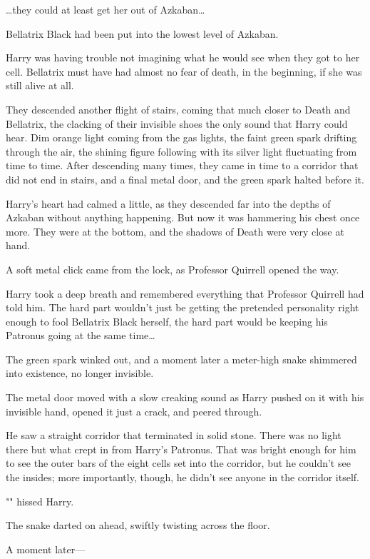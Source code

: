 {\ldots}they could at least get her out of Azkaban{\ldots}

Bellatrix Black had been put into the lowest level of Azkaban.

Harry was having trouble not imagining what he would see when they got to her 
cell. Bellatrix must have had almost no fear of death, in the beginning, if she 
was still alive at all.

They descended another flight of stairs, coming that much closer to Death and 
Bellatrix, the clacking of their invisible shoes the only sound that Harry 
could hear. Dim orange light coming from the gas lights, the faint green spark 
drifting through the air, the shining figure following with its silver light 
fluctuating from time to time.
\sbreak
After descending many times, they came in time to a corridor that did not end 
in stairs, and a final metal door, and the green spark halted before it.

Harry's heart had calmed a little, as they descended far into the depths of 
Azkaban without anything happening. But now it was hammering his chest once 
more. They were at the bottom, and the shadows of Death were very close at hand.

A soft metal click came from the lock, as Professor Quirrell opened the way.

Harry took a deep breath and remembered everything that Professor Quirrell had 
told him. The hard part wouldn't just be getting the pretended personality 
right enough to fool Bellatrix Black herself, the hard part would be keeping 
his Patronus going at the same time{\ldots}

The green spark winked out, and a moment later a meter-high snake shimmered 
into existence, no longer invisible.

The metal door moved with a slow creaking sound as Harry pushed on it with his 
invisible hand, opened it just a crack, and peered through.

He saw a straight corridor that terminated in solid stone. There was no light 
there but what crept in from Harry's Patronus. That was bright enough for him 
to see the outer bars of the eight cells set into the corridor, but he couldn't 
see the insides; more importantly, though, he didn't see anyone in the corridor 
itself.

"" hissed Harry.

The snake darted on ahead, swiftly twisting across the floor.

A moment later---

